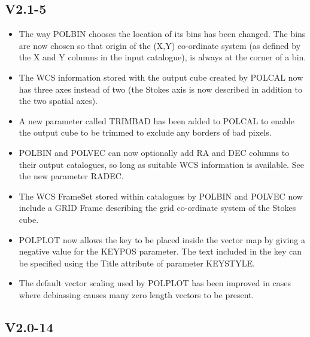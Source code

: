 \documentclass[twoside,11pt]{article}
\newcommand{\htmlref}[2]{#1}
\renewcommand{\_}{\texttt{\symbol{95}}}
\begin{document}
\subsection{V2.1-5}

\begin{itemize}
\item The way \htmlref{POLBIN}{POLBIN} chooses the location of its bins
has been changed. The bins are now chosen so that origin of the (X,Y) 
co-ordinate system (as defined by the X and Y columns in the input 
catalogue), is always at the corner of a bin.

\item The WCS information stored with the output cube created by 
\htmlref{POLCAL}{POLCAL} now has three axes instead of two (the Stokes
axis is now described in addition to the two spatial axes). 

\item A new parameter called TRIMBAD has been added to \htmlref{POLCAL}{POLCAL} 
to enable the output cube to be trimmed to exclude any borders of bad pixels.

\item \htmlref{POLBIN}{POLBIN} and \htmlref{POLVEC}{POLVEC} can now
optionally add RA and DEC columns to their output catalogues, so long as
suitable WCS information is available. See the new parameter RADEC.

\item The WCS FrameSet stored within catalogues by \htmlref{POLBIN}{POLBIN} 
and \htmlref{POLVEC}{POLVEC} now include a GRID Frame describing the 
grid co-ordinate system of the Stokes cube.

\item \htmlref{POLPLOT}{POLPLOT} now allows the key to be placed inside the
vector map by giving a negative value for the KEYPOS parameter. The text
included in the key can be specified using the Title attribute of
parameter KEYSTYLE.

\item The default vector scaling used by \htmlref{POLPLOT}{POLPLOT} has been 
improved in cases where debiassing causes many zero length vectors to be 
present.

\end{itemize}

\subsection{V2.0-14}
\end{document}
